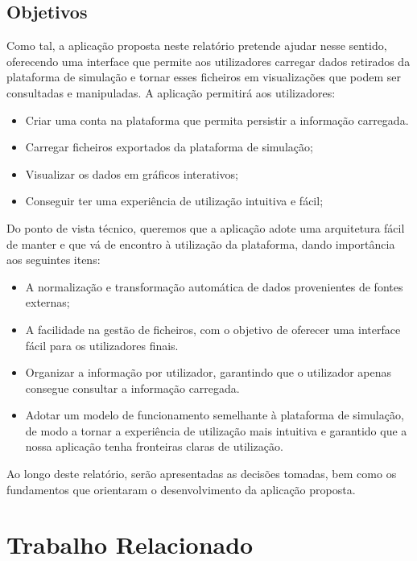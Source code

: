\section{Objetivos}

Como tal, a aplicação proposta neste relatório pretende ajudar nesse sentido, oferecendo uma interface que permite aos utilizadores carregar dados retirados da plataforma de simulação e tornar esses ficheiros em visualizações que podem ser consultadas e manipuladas. A aplicação permitirá aos utilizadores:

\begin{itemize}
    \item Criar uma conta na plataforma que permita persistir a informação carregada.
    \item Carregar ficheiros exportados da plataforma de simulação;
    \item Visualizar os dados em gráficos interativos;
    \item Conseguir ter uma experiência de utilização intuitiva e fácil;
\end{itemize}

Do ponto de vista técnico, queremos que a aplicação adote uma arquitetura fácil de manter e que vá de encontro à utilização da plataforma, dando importância aos seguintes itens:

\begin{itemize}
    \item A normalização e transformação automática de dados provenientes de fontes externas;
    \item A facilidade na gestão de ficheiros, com o objetivo de oferecer uma interface fácil para os utilizadores finais.
    \item Organizar a informação por utilizador, garantindo que o utilizador apenas consegue consultar a informação carregada.
    \item Adotar um modelo de funcionamento semelhante à plataforma de simulação, de modo a tornar a experiência de utilização mais intuitiva e garantido que a nossa aplicação tenha fronteiras claras de utilização.
\end{itemize}

Ao longo deste relatório, serão apresentadas as decisões tomadas, bem como os fundamentos que orientaram o desenvolvimento da aplicação proposta.

\chapter{Trabalho Relacionado}
\label{ch:trabalhoRelacionado}

